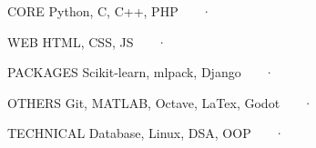 

\begin{cvhonors}

  \cvhonor
    {CORE} %
    {Python, C, C++, PHP} %
    {~~~·~~~} %

  \cvhonor
    {WEB} %
    {HTML, CSS, JS} %
    {~~~·~~~} %

  \cvhonor
    {PACKAGES} %
    {Scikit-learn, mlpack, Django} %
    {~~~·~~~} %

  \cvhonor
    {OTHERS} %
    {Git, MATLAB, Octave, LaTex, Godot} %
    {~~~·~~~} %

  \cvhonor
    {TECHNICAL} %
    {Database, Linux, DSA, OOP} %
    {~~~·~~~} %

\end{cvhonors}